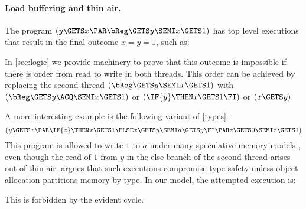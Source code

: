 \paragraph{Load buffering and thin air.}
The program
\begin{math}
  (y\GETS x \PAR \bReg\GETS y\SEMI x\GETS1)
\end{math}
has top level executions that result in the final outcome $x = y = 1$, such as:
\begin{tikzdisplay}[node distance=1em]
\end{tikzdisplay}
In \textsection\ref{sec:logic} we provide machinery to prove that this
outcome is impossible if there is order from read to write in both
threads.  This order can be achieved by replacing the second thread
\begin{math}
  (\bReg\GETS y\SEMI x\GETS1)
\end{math}
with 
\begin{math}
  (\bReg\GETS y\ACQ\SEMI x\GETS1)
\end{math}
or
\begin{math}
  (\IF{y}\THEN x\GETS 1\FI)
\end{math}
or
\begin{math}
  (x\GETS y).
\end{math}

A more interesting example is the following variant of \eqref{types}:
\begin{equation}
  \label{alan}
  (
    y\GETS x
  \PAR
    \IF{z}\THEN x\GETS1 \ELSE x\GETS y\SEMI a\GETS y \FI
  \PAR
    z\GETS0\SEMI z\GETS1
  )
\end{equation}
This program is allowed to write $1$ to $a$ under many speculative
memory models
\cite{Manson:2005:JMM:1047659.1040336,DBLP:conf/esop/JagadeesanPR10,DBLP:conf/popl/KangHLVD17},
even though the read of $1$ from $y$ in the else branch of the second
thread arises out of thin air.   \citet{DBLP:journals/toplas/Lochbihler13}
argues that such executions compromise type safety unless object allocation
partitions memory by type.
In our model, the attempted execution is:
\begin{tikzdisplay}[node distance=1em]
\end{tikzdisplay}
This is forbidden by the evident cycle.


